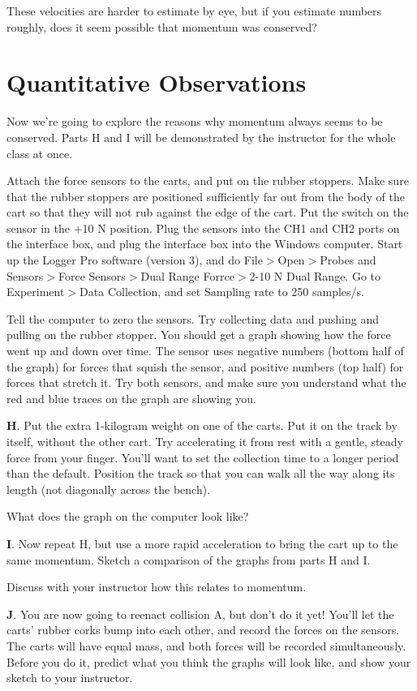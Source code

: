 These velocities are harder to estimate by eye, but if you estimate numbers roughly, does it seem possible
 that momentum was conserved?

\section*{Quantitative Observations}
Now we're going to explore the reasons why momentum always seems to be conserved. Parts H and I will be
demonstrated by the instructor for the whole class at once.

Attach the force sensors to the carts, and put on the rubber stoppers. Make sure that the rubber stoppers are
 positioned sufficiently far out from the body of the cart so that they will not rub against the
 edge of the cart. Put the switch on the sensor in the +10 N position. Plug the sensors into the CH1 and CH2
 ports on the interface box, and plug the interface box into the Windows computer. Start up the Logger Pro software (version 3), and do
File$>$Open$>$Probes and Sensors$>$Force Sensors$>$Dual Range Forrce$>$2-10 N Dual Range.
Go to Experiment$>$Data Collection, and set Sampling rate to 250 samples/s.

Tell the computer to zero the sensors.
Try collecting data and pushing and pulling on the rubber stopper. You should get a graph showing
 how the force went up and down over time. The sensor uses negative numbers (bottom half of the graph)
 for forces that squish the sensor, and positive numbers (top half) for forces that stretch it. Try
 both sensors, and make sure you understand what the red and blue traces on the graph are showing you.


{\textbf H.} Put the extra 1-kilogram weight on one of the carts. Put it on the track by itself,
 without the other cart. Try accelerating it from rest with a gentle, steady force from your finger. You'll want to set the collection
time to a longer period than the default. Position the track so that you can walk all the way along its
length (not diagonally across the bench). 

What does the graph on the computer look like?

{\textbf I.} Now repeat H, but use a more rapid acceleration to bring the cart up to the same momentum. Sketch a comparison of
 the graphs from parts H and I.

Discuss with your instructor how this relates to momentum.

{\textbf J.} You are now going to reenact collision A, but don't do it yet! You'll let the carts' rubber corks bump
 into each other, and record the forces on the sensors. The carts will have equal mass, and both forces will
 be recorded simultaneously. Before you do it, predict what you think the graphs will look like, and show
 your sketch to your instructor.

